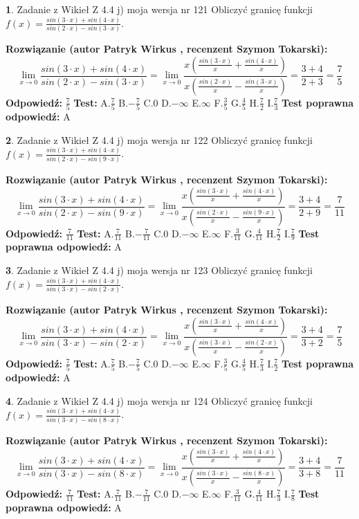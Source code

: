 \documentclass[12pt, a4paper]{article}
\theoremstyle{definition} %
\newtheorem{zad}{}
\newcommand{\zadStart}[1]{\begin{zad}#1\newline}
\newcommand{\zadStop}{\end{zad}}
\newcommand{\rozwStart}[2]{\noindent \textbf{Rozwiązanie (autor #1 , recenzent #2): }\newline}
\newcommand{\rozwStop}{\newline}
\newcommand{\odpStart}{\noindent \textbf{Odpowiedź:}\newline}
\newcommand{\odpStop}{\newline}
\newcommand{\testStart}{\noindent \textbf{Test:}\newline}
\newcommand{\testStop}{\newline}
\newcommand{\kluczStart}{\noindent \textbf{Test poprawna odpowiedź:}\newline}
\newcommand{\kluczStop}{\newline}
\begin{document}
\zadStart{Zadanie z Wikieł Z 4.4 j) moja wersja nr 121}
Obliczyć granicę funkcji $f(x)=\frac{sin(3\cdot x) +sin(4\cdot x)}{sin(2\cdot x) -sin(3\cdot x)}$.
\zadStop
\rozwStart{Patryk Wirkus}{Szymon Tokarski}
$$\lim\limits_{x\to 0}\frac{sin(3\cdot x) +sin(4\cdot x)}{sin(2\cdot x) -sin(3\cdot x)}=\lim\limits_{x\to 0}\frac{x(\frac{sin(3\cdot x)}{x}+\frac{sin(4\cdot x)}{x})}{x(\frac{sin(2\cdot x)}{x}-\frac{sin(3\cdot x)}{x})}=\frac{3+4}{2+3} = \frac{7}{5}$$
\rozwStop
\odpStart
$\frac{7}{5}$
\odpStop
\testStart
A.$\frac{7}{5}$
B.$-\frac{7}{5}$
C.$0$
D.$-\infty$
E.$\infty$
F.$\frac{3}{5}$
G.$\frac{4}{5}$
H.$\frac{7}{2}$
I.$\frac{7}{3}$
\testStop
\kluczStart
A
\kluczStop



\zadStart{Zadanie z Wikieł Z 4.4 j) moja wersja nr 122}
Obliczyć granicę funkcji $f(x)=\frac{sin(3\cdot x) +sin(4\cdot x)}{sin(2\cdot x) -sin(9\cdot x)}$.
\zadStop
\rozwStart{Patryk Wirkus}{Szymon Tokarski}
$$\lim\limits_{x\to 0}\frac{sin(3\cdot x) +sin(4\cdot x)}{sin(2\cdot x) -sin(9\cdot x)}=\lim\limits_{x\to 0}\frac{x(\frac{sin(3\cdot x)}{x}+\frac{sin(4\cdot x)}{x})}{x(\frac{sin(2\cdot x)}{x}-\frac{sin(9\cdot x)}{x})}=\frac{3+4}{2+9} = \frac{7}{11}$$
\rozwStop
\odpStart
$\frac{7}{11}$
\odpStop
\testStart
A.$\frac{7}{11}$
B.$-\frac{7}{11}$
C.$0$
D.$-\infty$
E.$\infty$
F.$\frac{3}{11}$
G.$\frac{4}{11}$
H.$\frac{7}{2}$
I.$\frac{7}{9}$
\testStop
\kluczStart
A
\kluczStop



\zadStart{Zadanie z Wikieł Z 4.4 j) moja wersja nr 123}
Obliczyć granicę funkcji $f(x)=\frac{sin(3\cdot x) +sin(4\cdot x)}{sin(3\cdot x) -sin(2\cdot x)}$.
\zadStop
\rozwStart{Patryk Wirkus}{Szymon Tokarski}
$$\lim\limits_{x\to 0}\frac{sin(3\cdot x) +sin(4\cdot x)}{sin(3\cdot x) -sin(2\cdot x)}=\lim\limits_{x\to 0}\frac{x(\frac{sin(3\cdot x)}{x}+\frac{sin(4\cdot x)}{x})}{x(\frac{sin(3\cdot x)}{x}-\frac{sin(2\cdot x)}{x})}=\frac{3+4}{3+2} = \frac{7}{5}$$
\rozwStop
\odpStart
$\frac{7}{5}$
\odpStop
\testStart
A.$\frac{7}{5}$
B.$-\frac{7}{5}$
C.$0$
D.$-\infty$
E.$\infty$
F.$\frac{3}{5}$
G.$\frac{4}{5}$
H.$\frac{7}{3}$
I.$\frac{7}{2}$
\testStop
\kluczStart
A
\kluczStop



\zadStart{Zadanie z Wikieł Z 4.4 j) moja wersja nr 124}
Obliczyć granicę funkcji $f(x)=\frac{sin(3\cdot x) +sin(4\cdot x)}{sin(3\cdot x) -sin(8\cdot x)}$.
\zadStop
\rozwStart{Patryk Wirkus}{Szymon Tokarski}
$$\lim\limits_{x\to 0}\frac{sin(3\cdot x) +sin(4\cdot x)}{sin(3\cdot x) -sin(8\cdot x)}=\lim\limits_{x\to 0}\frac{x(\frac{sin(3\cdot x)}{x}+\frac{sin(4\cdot x)}{x})}{x(\frac{sin(3\cdot x)}{x}-\frac{sin(8\cdot x)}{x})}=\frac{3+4}{3+8} = \frac{7}{11}$$
\rozwStop
\odpStart
$\frac{7}{11}$
\odpStop
\testStart
A.$\frac{7}{11}$
B.$-\frac{7}{11}$
C.$0$
D.$-\infty$
E.$\infty$
F.$\frac{3}{11}$
G.$\frac{4}{11}$
H.$\frac{7}{3}$
I.$\frac{7}{8}$
\testStop
\kluczStart
A
\kluczStop
\end{document}
